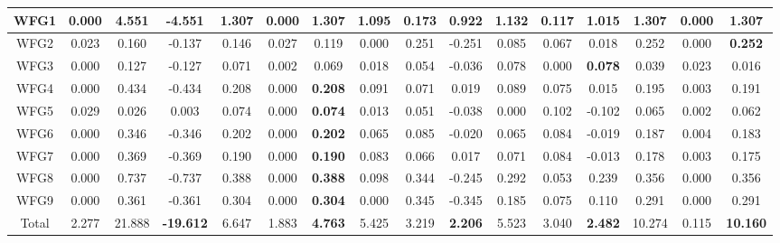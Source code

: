 \begin{table}[b]
{\begin{tabular}{|c|c|c|c|c|c|c|c|c|c|c|c|c|c|c|c|}
WFG1 & 0.000 & 4.551 & -4.551 & 1.307 & 0.000 & \textbf{1.307} & 1.095 & 0.173 & 0.922 & 1.132 & 0.117 & 1.015 & 1.307 & 0.000 & \textbf{1.307} \\ \hline
WFG2 & 0.023 & 0.160 & -0.137 & 0.146 & 0.027 & 0.119 & 0.000 & 0.251 & -0.251 & 0.085 & 0.067 & 0.018 & 0.252 & 0.000 & \textbf{0.252} \\ \hline
WFG3 & 0.000 & 0.127 & -0.127 & 0.071 & 0.002 & 0.069 & 0.018 & 0.054 & -0.036 & 0.078 & 0.000 & \textbf{0.078} & 0.039 & 0.023 & 0.016 \\ \hline
WFG4 & 0.000 & 0.434 & -0.434 & 0.208 & 0.000 & \textbf{0.208} & 0.091 & 0.071 & 0.019 & 0.089 & 0.075 & 0.015 & 0.195 & 0.003 & 0.191 \\ \hline
WFG5 & 0.029 & 0.026 & 0.003 & 0.074 & 0.000 & \textbf{0.074} & 0.013 & 0.051 & -0.038 & 0.000 & 0.102 & -0.102 & 0.065 & 0.002 & 0.062 \\ \hline
WFG6 & 0.000 & 0.346 & -0.346 & 0.202 & 0.000 & \textbf{0.202} & 0.065 & 0.085 & -0.020 & 0.065 & 0.084 & -0.019 & 0.187 & 0.004 & 0.183 \\ \hline
WFG7 & 0.000 & 0.369 & -0.369 & 0.190 & 0.000 & \textbf{0.190} & 0.083 & 0.066 & 0.017 & 0.071 & 0.084 & -0.013 & 0.178 & 0.003 & 0.175 \\ \hline
WFG8 & 0.000 & 0.737 & -0.737 & 0.388 & 0.000 & \textbf{0.388} & 0.098 & 0.344 & -0.245 & 0.292 & 0.053 & 0.239 & 0.356 & 0.000 & 0.356 \\ \hline
WFG9 & 0.000 & 0.361 & -0.361 & 0.304 & 0.000 & \textbf{0.304} & 0.000 & 0.345 & -0.345 & 0.185 & 0.075 & 0.110 & 0.291 & 0.000 & 0.291 \\ \hline
Total & 2.277 & 21.888 & \textbf{-19.612} & 6.647 & 1.883 & \textbf{4.763} & 5.425 & 3.219 & \textbf{2.206} & 5.523 & 3.040 & \textbf{2.482} & 10.274 & 0.115 & \textbf{10.160} \\ \hline
\end{tabular}%
}
\end{table}


